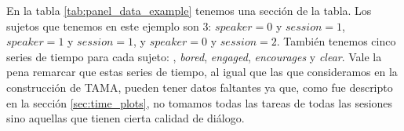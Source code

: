 En la tabla \ref{tab:panel_data_example} tenemos una sección de la tabla. Los sujetos que tenemos en este ejemplo son 3: $speaker = 0$ y $session=1$, $speaker = 1$ y $session=1$, y $speaker = 0$ y $session=2$. También tenemos cinco series de tiempo para cada sujeto: \entrainment, \emph{bored}, \emph{engaged}, \emph{encourages} y \emph{clear}. Vale la pena remarcar que estas series de tiempo, al igual que las que consideramos en la construcción de TAMA, pueden tener datos faltantes ya que, como fue descripto en la sección \ref{sec:time_plots}, no tomamos todas las tareas de todas las sesiones sino aquellas que tienen cierta calidad de diálogo.


